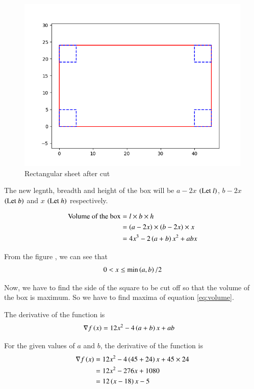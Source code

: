 \documentclass[journal,12pt,twocolumn]{IEEEtran}
\begin{document}
\begin{figure}[!htb]
    \centering
    \includegraphics[width=\columnwidth]{figs/rectangle2.png}
    \caption{Rectangular sheet after cut}
    \label{fig:rectangular sheet cut}
\end{figure}

The new legnth, breadth and height of the box will be $a-2x$ $\left(\text{Let }l\right)$, $b-2x$ $\left(\text{Let }b\right)$ and $x$ $\left(\text{Let }h\right)$ respectively.

\begin{align}
    \text{Volume of the box} &= l \times b \times h \\
    & = (a-2x) \times (b-2x) \times x \\
    \label{eq:volume} & = 4x^3 - 2\left(a+b\right)x^2 + abx
\end{align}

From the figure , we can see that
\begin{align}
    \label{eq:x_range}
    0 < x \leq \min\left(a,b\right)/2
\end{align}

Now, we have to find the side of the square to be cut off so that the volume of the box is maximum.
So we have to find maxima of equation \eqref{eq:volume}.

The derivative of the function is
\begin{align}
    \nabla f\left(x\right) &= 12x^2 - 4\left(a+b\right)x + ab 
\end{align}

For the given values of $a$ and $b$, the derivative of the function is
\begin{align}
    \nabla f\left(x\right) &= 12x^2 - 4\left(45+24\right)x + 45 \times 24\\ 
    &= 12x^2 - 276x + 1080\\
    &= 12\left(x-18\right){x-5}
\end{align}
\end{document}
